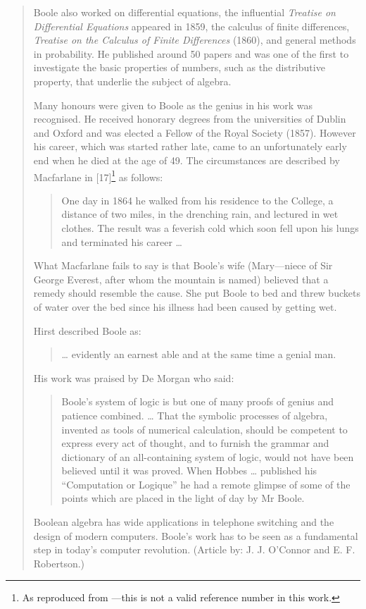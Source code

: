 \begin{quote}
Boole also worked on differential equations, the influential 
\emph{Treatise on Differential Equations} appeared in 1859, the calculus of finite
differences, \emph{Treatise on the Calculus of Finite Differences} (1860), 
and general methods in probability. He published around 50 papers and
was one of the first to investigate the basic properties of numbers, such 
as the distributive property, that underlie the subject of algebra.

Many honours were given to Boole as the genius in his work was recognised. 
He received honorary degrees from the universities of Dublin
and Oxford and was elected a Fellow of the Royal Society (1857). 
However his career, which was started rather late, came to an unfortunately
early end when he died at the age of 49.  The circumstances are described 
by Macfarlane in [17]\footnote{As reproduced from 
\cite{bibref:w:georgeboolebio01}---this is not a valid reference
number in this work.} as follows:

\begin{quote}
One day in 1864 he walked from his residence to the College, 
a distance of two miles, in the drenching rain, and lectured in wet
clothes.  The result was a feverish cold which soon fell upon his 
lungs and terminated his career \ldots{}
\end{quote}

What Macfarlane fails to say is that Boole's wife 
(Mary---niece of Sir George Everest, after whom the mountain is named) believed that a
remedy should resemble the cause. She put Boole to bed and threw 
buckets of water over the bed since his illness had been caused by getting
wet.

Hirst described Boole as:

\begin{quote}
\ldots{} evidently an earnest able and at the same time a genial man.
\end{quote}

His work was praised by De Morgan who said:

\begin{quote}
Boole's system of logic is but one of many proofs of genius and patience combined.
\ldots{} That the symbolic processes of algebra,
invented as tools of numerical calculation, should be competent to 
express every act of thought, and to furnish the grammar and
dictionary of an all-containing system of logic, would not have 
been believed until it was proved. When Hobbes \ldots{} published his
``Computation or Logique'' he had a remote glimpse of some of the points which 
are placed in the light of day by Mr Boole.
\end{quote}

Boolean algebra has wide applications in telephone switching and the 
design of modern computers. Boole's work has to be seen as a
fundamental step in today's computer revolution.
(Article by: J. J. O'Connor and E. F. Robertson.)
\end{quote}

